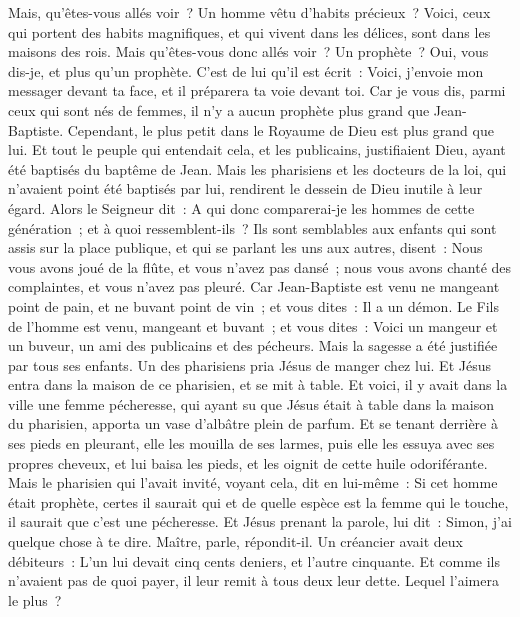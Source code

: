\begin{multicols}{2}
Mais, qu'êtes-vous allés voir~? Un homme vêtu d'habits précieux~? Voici, ceux qui portent des habits magnifiques, et qui vivent dans les délices, sont dans les maisons des rois.
Mais qu'êtes-vous donc allés voir~? Un prophète~? Oui, vous dis-je, et plus qu'un prophète.
C'est de lui qu'il est écrit~: Voici, j'envoie mon messager devant ta face, et il préparera ta voie devant toi.
Car je vous dis, parmi ceux qui sont nés de femmes, il n'y a aucun prophète plus grand que Jean-Baptiste. Cependant, le plus petit dans le Royaume de Dieu est plus grand que lui.
Et tout le peuple qui entendait cela, et les publicains, justifiaient Dieu, ayant été baptisés du baptême de Jean.
Mais les pharisiens et les docteurs de la loi, qui n'avaient point été baptisés par lui, rendirent le dessein de Dieu inutile à leur égard.
Alors le Seigneur dit~: A qui donc comparerai-je les hommes de cette génération~; et à quoi ressemblent-ils~?
Ils sont semblables aux enfants qui sont assis sur la place publique, et qui se parlant les uns aux autres, disent~: Nous vous avons joué de la flûte, et vous n'avez pas dansé~; nous vous avons chanté des complaintes, et vous n'avez pas pleuré.
Car Jean-Baptiste est venu ne mangeant point de pain, et ne buvant point de vin~; et vous dites~: Il a un démon.
Le Fils de l'homme est venu, mangeant et buvant~; et vous dites~: Voici un mangeur et un buveur, un ami des publicains et des pécheurs.
Mais la sagesse a été justifiée par tous ses enfants.
Un des pharisiens pria Jésus de manger chez lui. Et Jésus entra dans la maison de ce pharisien, et se mit à table.
Et voici, il y avait dans la ville une femme pécheresse, qui ayant su que Jésus était à table dans la maison du pharisien, apporta un vase d'albâtre plein de parfum.
Et se tenant derrière à ses pieds en pleurant, elle les mouilla de ses larmes, puis elle les essuya avec ses propres cheveux, et lui baisa les pieds, et les oignit de cette huile odoriférante.
Mais le pharisien qui l'avait invité, voyant cela, dit en lui-même~: Si cet homme était prophète, certes il saurait qui et de quelle espèce est la femme qui le touche, il saurait que c'est une pécheresse.
Et Jésus prenant la parole, lui dit~: Simon, j'ai quelque chose à te dire. Maître, parle, répondit-il.
Un créancier avait deux débiteurs~: L'un lui devait cinq cents deniers, et l'autre cinquante.
Et comme ils n'avaient pas de quoi payer, il leur remit à tous deux leur dette. Lequel l'aimera le plus~?

\end{multicols}
